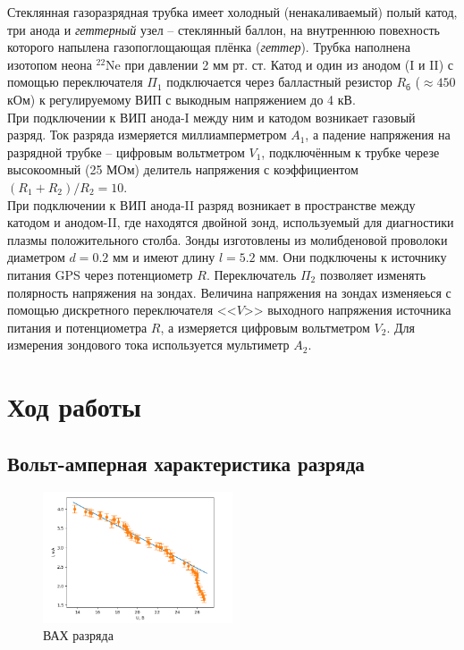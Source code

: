 \documentclass[a4paper]{article}
\begin{document}
Стеклянная газоразрядная трубка имеет холодный (ненакаливаемый) полый катод, три анода и \textit{геттерный} узел -- стеклянный баллон, на внутреннюю повехность которого напылена газопоглощающая плёнка (\textit{геттер}). Трубка наполнена изотопом неона $^{22}$Ne при давлении 2 мм рт. ст. Катод и один из анодом (I и II) с помощью переключателя $\Pi_1$ подключается через балластный резистор $R_\text{б}$ ($\approx 450$ кОм) к регулируемому ВИП с выкодным напряжением до 4 кВ.\\
При подключении к ВИП анода-I между ним и катодом возникает газовый разряд. Ток разряда измеряется миллиамперметром $A_1$, а падение напряжения на разрядной трубке -- цифровым вольтметром $V_1$, подключённым к трубке черезе высокоомный (25 МОм) делитель напряжения с коэффициентом $(R_1+R_2)/R_2 = 10$.\\
При подключении к ВИП анода-II разряд возникает в пространстве между катодом и анодом-II, где находятся двойной зонд, используемый для диагностики плазмы положительного столба. Зонды изготовлены из молибденовой проволоки диаметром $d = 0.2$ мм и имеют длину $l = 5.2$ мм. Они подключены к источнику питания GPS через потенциометр $R$. Переключатель $\Pi_2$ позволяет изменять полярность напряжения на зондах. Величина напряжения на зондах изменяеься с помощью дискретного переключателя <<$V$>> выходного напряжения источника питания и потенциометра $R$, а измеряется цифровым вольтметром $V_2$. Для измерения зондового тока используется мультиметр $A_2$.

\newpage

\section{Ход работы}

\subsection{Вольт-амперная характеристика разряда}

\begin{figure}
    \vspace{-0.7cm}
    \includegraphics[width = 0.50\textwidth]{VAH_1.png}
    \caption[width = 0.50\textwidth]{ВАХ разряда}
\end{figure}
\end{document}

